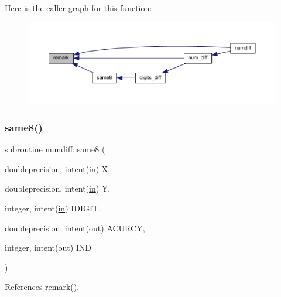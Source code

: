 Here is the caller graph for this function\+:
\nopagebreak
\begin{figure}[H]
\begin{center}
\leavevmode
\includegraphics[width=350pt]{numdiff_8f90_ab59cb8434f0791b438eb140dd577e0cc_icgraph}
\end{center}
\end{figure}
\mbox{\label{numdiff_8f90_ad61224828d0e9d4b998278d50ab4842f}} 
\subsubsection{\texorpdfstring{same8()}{same8()}}
{\footnotesize\ttfamily \hyperlink{M__stopwatch_83_8txt_acfbcff50169d691ff02d4a123ed70482}{subroutine} numdiff\+::same8 (\begin{DoxyParamCaption}\item[{doubleprecision, intent(\hyperlink{M__journal_83_8txt_afce72651d1eed785a2132bee863b2f38}{in})}]{X,  }\item[{doubleprecision, intent(\hyperlink{M__journal_83_8txt_afce72651d1eed785a2132bee863b2f38}{in})}]{Y,  }\item[{integer, intent(\hyperlink{M__journal_83_8txt_afce72651d1eed785a2132bee863b2f38}{in})}]{I\+D\+I\+G\+IT,  }\item[{doubleprecision, intent(out)}]{A\+C\+U\+R\+CY,  }\item[{integer, intent(out)}]{I\+ND }\end{DoxyParamCaption})}



References remark().

